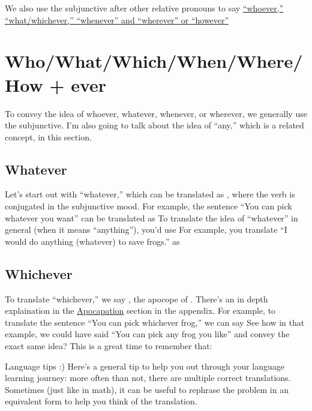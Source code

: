 We also use the subjunctive after other relative pronouns to say \hyperref[sec:ever]{``whoever,'' ``what/whichever,'' ``whenever'' and ``wherever'' or ``however''}


\section{Who/What/Which/When/Where/How + ever}
\label{sec:ever}
To convey the idea of whoever, whatever, whenever, or wherever, we generally use the subjunctive. I'm also going to talk about the idea of ``any,'' which is a related concept, in this section. \\

\subsection{Whatever}
Let's start out with ``whatever,'' which can be translated as , where the verb is conjugated in the subjunctive mood. For example, the sentence ``You can pick whatever you want'' can be translated as  To translate the idea of ``whatever'' in general (when it means ``anything''), you'd use  For example, you translate ``I would do anything (whatever) to save frogs.'' as 

\subsection{Whichever}
\label{subsec:cualquier}
To translate ``whichever,'' we say , the apocope of . There's an in depth explaination in the \hyperref[sec:apo]{Apocapation} section in the appendix. For example, to translate the sentence ``You can pick whichever frog,'' we can say  See how in that example, we could have said ``You can pick any frog you like'' and convey the exact same idea? This is a great time to remember that:

\begin{conf}{Language tips :)}
	Here's a general tip to help you out through your language learning journey: more often than not, there are multiple correct translations. Sometimes (just like in math), it can be useful to rephrase the problem in an equivalent form to help you think of the translation.  
\end{conf}

